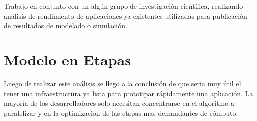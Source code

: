 \documentclass[a4paper]{report}
\begin{document}
\bigskip

Trabajo en conjunto con un algún grupo de investigación científica,
realizando análisis de rendimiento de aplicaciones ya existentes utilizadas
para publicación de resultados de modelado o simulación.

\section{Modelo en Etapas}

Luego de realizar este análisis se llego a la conclusión de que seria muy útil
el tener una infraestructura ya lista para prototipar rápidamente una aplicación.
La mayoría de los desarrolladores solo necesitan concentrarse en el algoritmo a
paralelizar y en la optimizacion de las etapas mas demandantes de cómputo.
\end{document}
